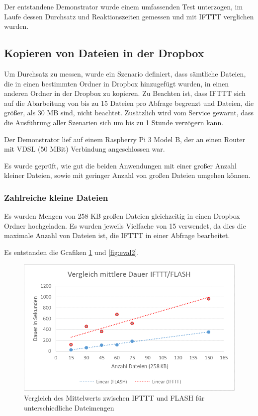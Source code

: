 Der entstandene Demonstrator wurde einem umfassenden Test unterzogen, im Laufe dessen Durchsatz und Reaktionszeiten gemessen und mit IFTTT verglichen wurden. 

\subsection{Kopieren von Dateien in der Dropbox}
Um Durchsatz zu messen, wurde ein Szenario definiert, dass sämtliche Dateien, die in einen bestimmten Ordner in Dropbox hinzugefügt wurden, in einen anderen Ordner in der Dropbox zu kopieren. Zu Beachten ist, dass IFTTT sich auf die Abarbeitung von bis zu 15 Dateien pro Abfrage begrenzt und Dateien, die größer, als 30 MB sind, nicht beachtet. Zusätzlich wird vom Service gewarnt, dass die Ausführung aller Szenarien sich um bis zu 1 Stunde verzögern kann.

Der Demonstrator lief auf einem Raspberry Pi 3 Model B, der an einen Router mit VDSL (50 MBit) Verbindung angeschlossen war.

Es wurde geprüft, wie gut die beiden Anwendungen mit einer großer Anzahl kleiner Dateien, sowie mit geringer Anzahl von großen Dateien umgehen können. 

\subsubsection{Zahlreiche kleine Dateien}
Es wurden Mengen von 258 KB großen Dateien gleichzeitig in einen Dropbox Ordner hochgeladen. Es wurden jeweils Vielfache von 15 verwendet, da dies die maximale Anzahl von Dateien ist, die IFTTT in einer Abfrage bearbeitet.

Es entstanden die Grafiken \ref{fig:eval1} und \ref{fig:eval2}.
\begin{figure}
	\centering
	\includegraphics[width=\textwidth]{bilder/vs_mittelwert}
	\caption{Vergleich des Mittelwerts zwischen IFTTT und FLASH für unterschiedliche Dateimengen}
	\label{fig:eval1}
\end{figure}


